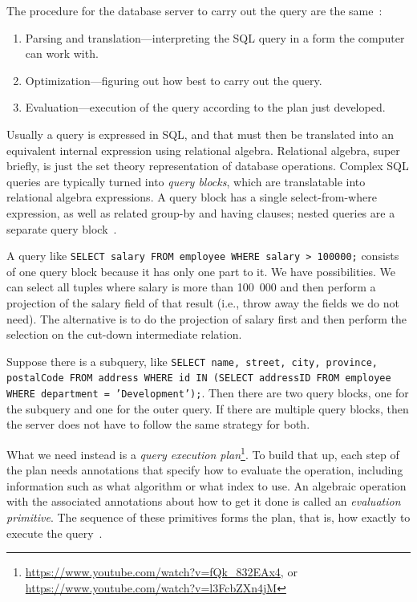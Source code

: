 \documentclass[a4paper]{report}
\begin{document}
The procedure for the database server to carry out the query are the same~\cite{dsc}:

\begin{enumerate}
	\item Parsing and translation---interpreting the SQL query in a form the computer can work with.
	\item Optimization---figuring out how best to carry out the query.
	\item Evaluation---execution of the query according to the plan just developed.
\end{enumerate}

Usually a query is expressed in SQL, and that must then be translated into an equivalent internal expression using relational algebra. Relational algebra, super briefly, is just the set theory representation of database operations. Complex SQL queries are typically turned into \textit{query blocks}, which are translatable into relational algebra expressions. A query block has a single select-from-where expression, as well as related group-by and having clauses; nested queries are a separate query block~\cite{fds}.

A query like \texttt{SELECT salary FROM employee WHERE salary > 100000;} consists of one query block because it has only one part to it. We have possibilities. We can select all tuples where salary is more than 100~000 and then perform a projection of the salary field of that result (i.e., throw away the fields we do not need). The alternative is to do the projection of salary first and then perform the selection on the cut-down intermediate relation.

Suppose there is a subquery, like \texttt{SELECT name, street, city, province, postalCode FROM address WHERE id IN (SELECT addressID FROM employee WHERE department = 'Development');}. Then there are two query blocks, one for the subquery and one for the outer query. If there are multiple query blocks, then the server does not have to follow the same strategy for both.

What we need instead is a \textit{query execution plan}\footnote{\url{https://www.youtube.com/watch?v=fQk_832EAx4}, or \url{https://www.youtube.com/watch?v=l3FcbZXn4jM}}. To build that up, each step of the plan needs annotations that specify how to evaluate the operation, including information such as what algorithm or what index to use. An algebraic operation with the associated annotations about how to get it done is called an \textit{evaluation primitive}. The sequence of these primitives forms the plan, that is, how exactly to execute the query~\cite{dsc}. 
\end{document}

